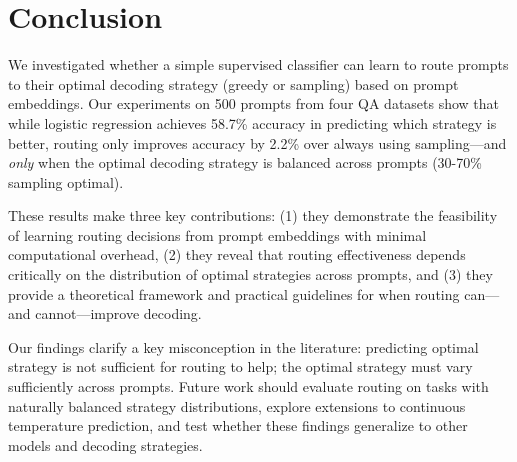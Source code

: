 \documentclass[11pt,letterpaper]{article}
\begin{document}
\section{Conclusion}

We investigated whether a simple supervised classifier can learn to route prompts to their optimal decoding strategy (greedy or sampling) based on prompt embeddings. Our experiments on 500 prompts from four QA datasets show that while logistic regression achieves 58.7\% accuracy in predicting which strategy is better, routing only improves accuracy by 2.2\% over always using sampling---and \textit{only} when the optimal decoding strategy is balanced across prompts (30-70\% sampling optimal).

These results make three key contributions: (1) they demonstrate the feasibility of learning routing decisions from prompt embeddings with minimal computational overhead, (2) they reveal that routing effectiveness depends critically on the distribution of optimal strategies across prompts, and (3) they provide a theoretical framework and practical guidelines for when routing can---and cannot---improve decoding.

Our findings clarify a key misconception in the literature: predicting optimal strategy is not sufficient for routing to help; the optimal strategy must vary sufficiently across prompts. Future work should evaluate routing on tasks with naturally balanced strategy distributions, explore extensions to continuous temperature prediction, and test whether these findings generalize to other models and decoding strategies.



\end{document}
